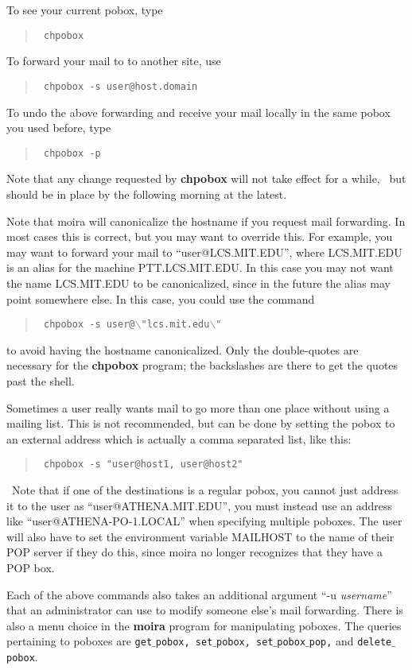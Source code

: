 \documentclass{book}
\begin{document}
To see your current pobox, type
\begin{quotation}\tt
chpobox
\end{quotation}
To forward your mail to to another site, use
\begin{quotation}\tt
chpobox -s user@host.domain
\end{quotation}
To undo the above forwarding and receive your mail locally in the same
pobox you used before, type
\begin{quotation}\tt
chpobox -p
\end{quotation}
Note that any change requested by {\bf chpobox} will not take effect for a
while, \athena\ but should be in place by the following morning at
the latest.

Note that moira will canonicalize the hostname if you request mail
forwarding.  In most cases this is correct, but you may want to
override this.  For example, you may want to forward your mail to
``user@LCS.MIT.EDU'', where LCS.MIT.EDU is an alias for the machine
PTT.LCS.MIT.EDU.  In this case you may not want the name LCS.MIT.EDU
to be canonicalized, since in the future the alias may point
somewhere else.  In this case, you could use the command
\begin{quotation}\tt
chpobox -s user@$\backslash$"lcs.mit.edu$\backslash$"
\end{quotation}
to avoid having the hostname canonicalized.  Only the double-quotes
are necessary for the {\bf chpobox} program; the backslashes are there to
get the quotes past the shell.

Sometimes a user really wants mail to go more than one place
without using a mailing list.  This is not recommended, but can be
done by setting the pobox to an external address which is actually a
comma separated list, like this:
\begin{quotation}\tt
\noindent chpobox -s "user@host1, user@host2"
\end{quotation}
\athena\ Note that if one of the destinations is a regular pobox, you
cannot just address it to the user as ``user@ATHENA.MIT.EDU'', you
must instead use an address like ``user@ATHENA-PO-1.LOCAL'' when
specifying multiple poboxes.  The user will also have to set the
environment variable MAILHOST to the name of their POP server if they
do this, since moira no longer recognizes that they have a POP box.

Each of the above commands also takes an additional argument ``-u
{\em username}'' that an administrator can use to modify someone else's
mail forwarding.  There is also a menu choice in the {\bf moira} program
for manipulating poboxes.  The queries pertaining to poboxes are
{\tt get$\_$pobox, set$\_$pobox, set$\_$pobox$\_$pop,} and {\tt delete$\_$pobox}.
\end{document}
